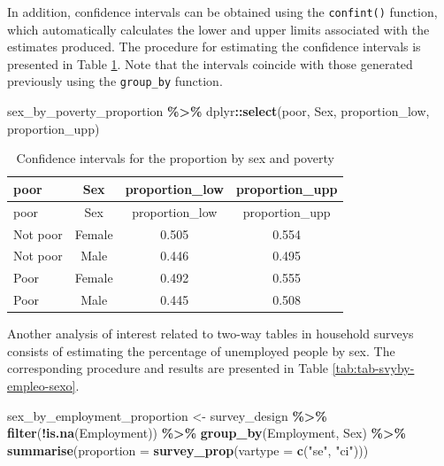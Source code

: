 \documentclass[
  english,
  12pt,
]{book}
\newenvironment{Shaded}{\begin{snugshade}}{\end{snugshade}}
\newcommand{\AttributeTok}[1]{\textcolor[rgb]{0.13,0.29,0.53}{#1}}
\newcommand{\FunctionTok}[1]{\textcolor[rgb]{0.13,0.29,0.53}{\textbf{#1}}}
\newcommand{\NormalTok}[1]{#1}
\newcommand{\OtherTok}[1]{\textcolor[rgb]{0.56,0.35,0.01}{#1}}
\newcommand{\SpecialCharTok}[1]{\textcolor[rgb]{0.81,0.36,0.00}{\textbf{#1}}}
\newcommand{\StringTok}[1]{\textcolor[rgb]{0.31,0.60,0.02}{#1}}
\begin{document}
In addition, confidence intervals can be obtained using the \texttt{confint()} function, which automatically calculates the lower and upper limits associated with the estimates produced. The procedure for estimating the confidence intervals is presented in Table \ref{tab:tab-confint-sexo-pobreza}. Note that the intervals coincide with those generated previously using the \texttt{group\_by} function.

\begin{Shaded}
\begin{Highlighting}[]
\NormalTok{sex\_by\_poverty\_proportion }\SpecialCharTok{\%\textgreater{}\%}
\NormalTok{  dplyr}\SpecialCharTok{::}\FunctionTok{select}\NormalTok{(poor, Sex, proportion\_low, proportion\_upp)}
\end{Highlighting}
\end{Shaded}

\begin{longtable}[]{@{}lccc@{}}
\caption{\label{tab:tab-confint-sexo-pobreza}Confidence intervals for the proportion by sex and poverty}\tabularnewline
\toprule\noalign{}
poor & Sex & proportion\_low & proportion\_upp \\
\midrule\noalign{}
\endfirsthead
\toprule\noalign{}
poor & Sex & proportion\_low & proportion\_upp \\
\midrule\noalign{}
\endhead
\bottomrule\noalign{}
\endlastfoot
Not poor & Female & 0.505 & 0.554 \\
Not poor & Male & 0.446 & 0.495 \\
Poor & Female & 0.492 & 0.555 \\
Poor & Male & 0.445 & 0.508 \\
\end{longtable}

Another analysis of interest related to two-way tables in household surveys consists of estimating the percentage of unemployed people by sex. The corresponding procedure and results are presented in Table \ref{tab:tab-svyby-empleo-sexo}.

\begin{Shaded}
\begin{Highlighting}[]
\NormalTok{sex\_by\_employment\_proportion }\OtherTok{\textless{}{-}}\NormalTok{ survey\_design }\SpecialCharTok{\%\textgreater{}\%}
  \FunctionTok{filter}\NormalTok{(}\SpecialCharTok{!}\FunctionTok{is.na}\NormalTok{(Employment)) }\SpecialCharTok{\%\textgreater{}\%}
  \FunctionTok{group\_by}\NormalTok{(Employment, Sex) }\SpecialCharTok{\%\textgreater{}\%}
  \FunctionTok{summarise}\NormalTok{(}\AttributeTok{proportion =} \FunctionTok{survey\_prop}\NormalTok{(}\AttributeTok{vartype =} \FunctionTok{c}\NormalTok{(}\StringTok{"se"}\NormalTok{, }\StringTok{"ci"}\NormalTok{)))}
\end{Highlighting}
\end{Shaded}
\end{document}
